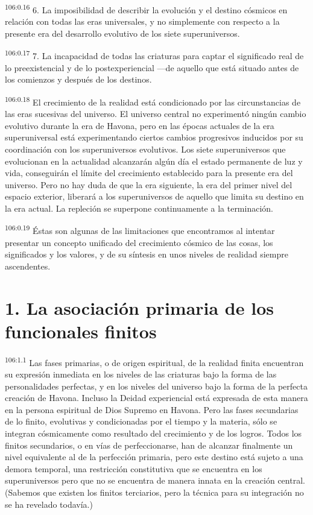 \documentclass[twoside, 11pt]{book}
\begin{document}
\par
\textsuperscript{106:0.16} 6. La imposibilidad de describir la evolución y el destino cósmicos en relación con todas las eras universales, y no simplemente con respecto a la presente era del desarrollo evolutivo de los siete superuniversos.

\par
\textsuperscript{106:0.17} 7. La incapacidad de todas las criaturas para captar el significado real de lo preexistencial y de lo postexperiencial ---de aquello que está situado antes de los comienzos y después de los destinos.

\par
\textsuperscript{106:0.18} El crecimiento de la realidad está condicionado por las circunstancias de las eras sucesivas del universo. El universo central no experimentó ningún cambio evolutivo durante la era de Havona, pero en las épocas actuales de la era superuniversal está experimentando ciertos cambios progresivos inducidos por su coordinación con los superuniversos evolutivos. Los siete superuniversos que evolucionan en la actualidad alcanzarán algún día el estado permanente de luz y vida, conseguirán el límite del crecimiento establecido para la presente era del universo. Pero no hay duda de que la era siguiente, la era del primer nivel del espacio exterior, liberará a los superuniversos de aquello que limita su destino en la era actual. La repleción se superpone continuamente a la terminación.

\par
\textsuperscript{106:0.19} Éstas son algunas de las limitaciones que encontramos al intentar presentar un concepto unificado del crecimiento cósmico de las cosas, los significados y los valores, y de su síntesis en unos niveles de realidad siempre ascendentes.

\section*{1. La asociación primaria de los funcionales finitos}
\par
\textsuperscript{106:1.1} Las fases primarias, o de origen espiritual, de la realidad finita encuentran su expresión inmediata en los niveles de las criaturas bajo la forma de las personalidades perfectas, y en los niveles del universo bajo la forma de la perfecta creación de Havona. Incluso la Deidad experiencial está expresada de esta manera en la persona espiritual de Dios Supremo en Havona. Pero las fases secundarias de lo finito, evolutivas y condicionadas por el tiempo y la materia, sólo se integran cósmicamente como resultado del crecimiento y de los logros. Todos los finitos secundarios, o en vías de perfeccionarse, han de alcanzar finalmente un nivel equivalente al de la perfección primaria, pero este destino está sujeto a una demora temporal, una restricción constitutiva que se encuentra en los superuniversos pero que no se encuentra de manera innata en la creación central. (Sabemos que existen los finitos terciarios, pero la técnica para su integración no se ha revelado todavía.)
\end{document}
